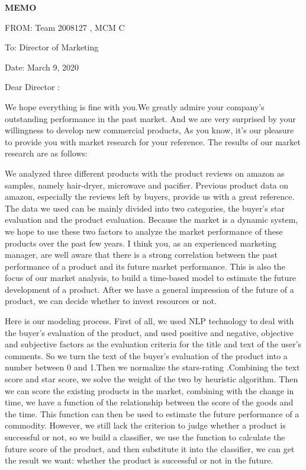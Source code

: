 \documentclass[13pt]{ctexart}
\begin{document}
\setmainfont{TeX Gyre Pagella}
\newpage
{}
\thispagestyle{empty}

{\centering \fontsize{18pt}{14pt}\selectfont \textbf{MEMO}\par}

\noindent FROM: Team {} 2008127 , MCM C

\noindent To: Director of Marketing

\noindent Date: March 9, 2020

\vspace{10pt}

Dear Director :

We hope everything is fine with you.We greatly admire your company's outstanding performance in the past market. And we are very surprised by your willingness to develop new commercial products, As you know, it's our pleasure to provide you with market research for your reference. The results of our market research are as follows:

We analyzed three different products with the product reviews on amazon as samples, namely hair-dryer, microwave and pacifier. Previous product data on amazon, especially the reviews left by buyers, provide us with a great reference. The data we used can be mainly divided into two categories, the buyer's star evaluation and the product evaluation. Because the market is a dynamic system, we hope to use these two factors to analyze the market performance of these products over the past few years. I think you, as an experienced marketing manager, are well aware that there is a strong correlation between the past performance of a product and its future market performance. This is also the focus of our market analysis, to build a time-based model to estimate the future development of a product. After we have a general impression of the future of a product, we can decide whether to invest resources or not.

Here is our modeling process. First of all, we used NLP technology to deal with the buyer's evaluation of the product, and used positive and negative, objective and subjective factors as the evaluation criteria for the title and text of the user's comments. So we turn the text of the buyer's evaluation of the product into a number between 0 and 1.Then we normalize the stars-rating .Combining the text score and star score, we solve the weight of the two by heuristic algorithm. Then we can score the existing products in the market, combining with the change in time, we have a function of the relationship between the score of the goods and the time. This function can then be used to estimate the future performance of a commodity. However, we still lack the criterion to judge whether a product is successful or not, so we build a classifier, we use the function to calculate the future score of the product, and then substitute it into the classifier, we can get the result we want: whether the product is successful or not in the future.
\end{document}
